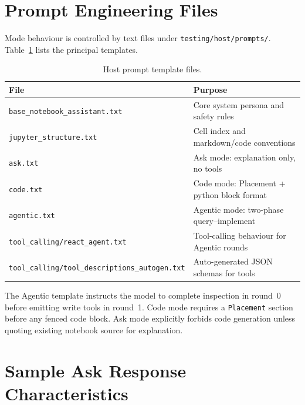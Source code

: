\section{Prompt Engineering Files}
\label{app:prompts}

Mode behaviour is controlled by text files under \texttt{testing/host/prompts/}. Table~\ref{tab:app-prompt-files} lists the principal templates.

\begin{table}[!ht]
\centering
\caption{Host prompt template files.}
\label{tab:app-prompt-files}
\footnotesize
\setlength{\tabcolsep}{3pt}
\renewcommand{\arraystretch}{1.02}
\begin{tabular}[t]{|>{\raggedright\arraybackslash\ttfamily\footnotesize}p{4.55cm}|>{\raggedright\arraybackslash}p{7.15cm}|}
\hline
\textbf{File} & \textbf{Purpose} \\ \hline
\texttt{base\_notebook\_assistant.txt} & Core system persona and safety rules \\ \hline
\texttt{jupyter\_structure.txt} & Cell index and markdown/code conventions \\ \hline
\texttt{ask.txt} & Ask mode: explanation only, no tools \\ \hline
\texttt{code.txt} & Code mode: Placement + python block format \\ \hline
\texttt{agentic.txt} & Agentic mode: two-phase query--implement \\ \hline
\texttt{tool\_calling/react\_agent.txt} & Tool-calling behaviour for Agentic rounds \\ \hline
\texttt{tool\_calling/}\newline\texttt{tool\_descriptions\_autogen.txt} & Auto-generated JSON schemas for tools \\ \hline
\end{tabular}
\end{table}

The Agentic template instructs the model to complete inspection in round~0 before emitting write tools in round~1. Code mode requires a \texttt{Placement} section before any fenced code block. Ask mode explicitly forbids code generation unless quoting existing notebook source for explanation.
\vspace{-6pt}

\section{Sample Ask Response Characteristics}
\label{app:sample-ask}


